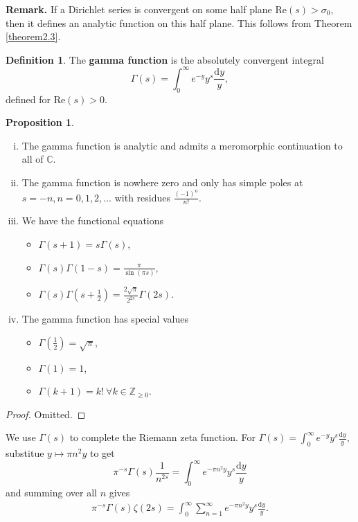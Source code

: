 \documentclass{article}
\theoremstyle{definition}
\newtheorem{prop}[theorem]{Proposition}
\newtheorem{defn}[theorem]{Definition}
\begin{document}
\textbf{Remark.} If a Dirichlet series is convergent on some half plane $\text{Re}(s)>\sigma_0$, then it defines an analytic function on this half plane. This follows from Theorem \ref{theorem2.3}.
\begin{defn}\label{defn2.11}
    The \textbf{gamma function} is the absolutely convergent integral \[
    \Gamma(s) = \int_{0}^{\infty} e^{-y}y^s \frac{\mathrm{d}y}{y},
    \]
    defined for $\text{Re}(s)>0$.
\end{defn}
\begin{prop}\label{prop2.12}
    \begin{enumerate}[(i)]
        \item The gamma function is analytic and admits a meromorphic continuation to all of $\mathbb{C}$.
        \item The gamma function is nowhere zero and only has simple poles at $s = -n, n = 0,1,2,\ldots$ with residues $\frac{(-1)^n}{n!}$.
        \item We have the functional equations
        \begin{itemize}
            \item $\Gamma(s+1)=s \Gamma(s)$,
            \item $\Gamma(s) \Gamma(1-s) = \frac{\pi}{\sin(\pi s)}$,
            \item $\Gamma(s) \Gamma\left(s+\frac{1}{2}\right) = \frac{2\sqrt{\pi}}{2^{2s}}\Gamma(2s)$.
        \end{itemize}
        \item The gamma function has special values 
        \begin{itemize}
            \item $\Gamma \left(\frac{1}{2}\right) = \sqrt{\pi}$,
            \item $\Gamma(1)=1$,
            \item $\Gamma(k+1) = k! ~\forall k \in \mathbb{Z}_{\ge 0}$.
        \end{itemize}
    \end{enumerate}
\end{prop}
\begin{proof}
    Omitted.
\end{proof}
We use $\Gamma(s)$ to complete the Riemann zeta function. For $\Gamma(s) = \int_{0}^{\infty} e^{-y}y^s \frac{\mathrm{d}y}{y}$, substitue $y \mapsto \pi n^2y$ to get \[
\pi^{-s}\Gamma(s)\frac{1}{n^{2s}} = \int_{0}^{\infty} e^{-\pi n^2 y} y^s \frac{\mathrm{d}y}{y}
\]
and summing over all $n$ gives 
\begin{align*}
    \pi^{-s}\Gamma(s)\zeta(2s) = \int_{0}^{\infty} \sum_{n=1}^{\infty} e^{-\pi n^2 y} y^s \frac{\mathrm{d}y}{y}.
\end{align*}
\end{document}
